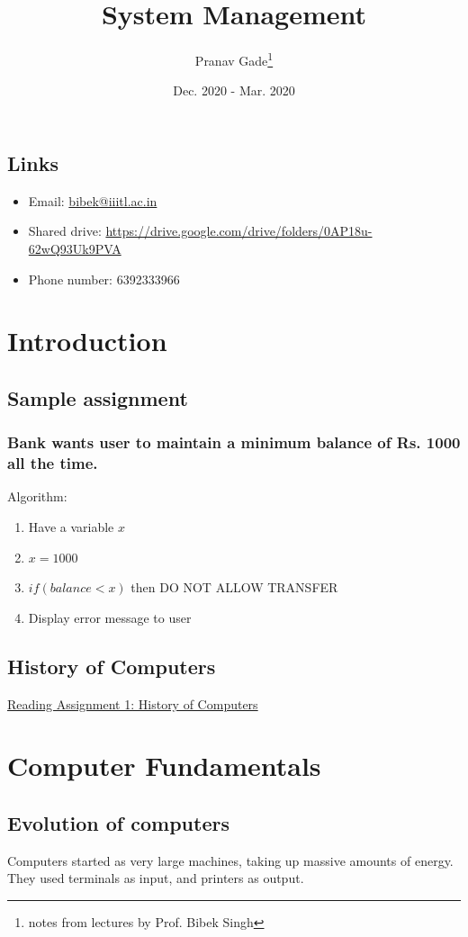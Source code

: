 \documentclass[10pt, a4paper]{report}
\author{Pranav Gade\thanks{notes from lectures by Prof. Bibek Singh}}
\date{Dec. 2020 - Mar. 2020}
\title{System Management}
\begin{document}
	\maketitle
	\tableofcontents
		\section*{Links}
	\begin{itemize}
		\item Email: \href{mailto:bibek@iiitl.ac.in}{bibek@iiitl.ac.in}
		\item Shared drive: \href{https://drive.google.com/drive/folders/0AP18u-62wQ93Uk9PVA}{https://drive.google.com/drive/folders/0AP18u-62wQ93Uk9PVA}
		\item Phone number: 6392333966
	\end{itemize}
	\newpage
	\setcounter{chapter}{-1}
	\chapter{Introduction}
	\section*{Sample assignment}
	\subsection*{Bank wants user to maintain a minimum balance of Rs. 1000 all the time.}
	Algorithm:
	\begin{enumerate}
		\item Have a variable $ x $
		\item $ x = 1000 $
		\item $ if(balance < x) $ then DO NOT ALLOW TRANSFER
		\item Display error message to user
	\end{enumerate}
	\section*{History of Computers}
	\href{https://docs.google.com/document/d/1AKiCZ0Cal-O2vfzAeWJqINXd06CINqywDTrg5B8KlEw/edit?usp=sharing}{Reading Assignment 1: History of Computers}
	\chapter{Computer Fundamentals}
		\section{Evolution of computers}
			Computers started as very large machines, taking up massive amounts of energy. They used terminals as input, and printers as output.
			
\end{document}
